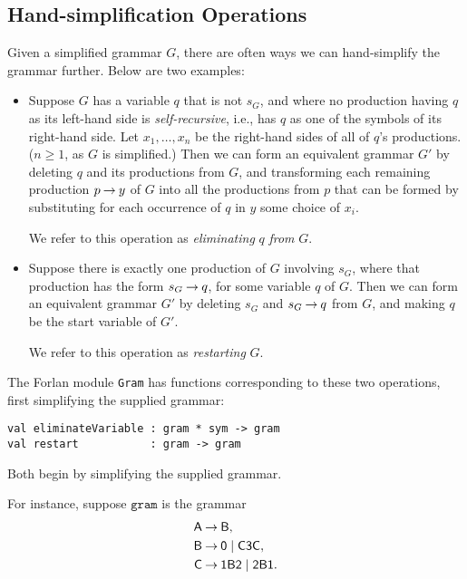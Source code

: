 \subsection{Hand-simplification Operations}

%
%
Given a simplified grammar $G$, there are often ways we can hand-simplify
the grammar further. Below are two examples:
\begin{itemize}
\item Suppose $G$ has a variable $q$ that is not $s_G$, and where no
  production having $q$ as its left-hand side is
  \emph{self-recursive}, i.e., has $q$ as one of the symbols of its
  right-hand side. Let $x_1,\ldots,x_n$ be the right-hand sides of all
  of $q$'s productions. ($n\geq 1$, as $G$ is simplified.)  Then we
  can form an equivalent grammar $G'$ by deleting $q$ and its
  productions from $G$, and transforming each remaining production
  $p\mathbin{\to} y$ of $G$ into all the productions from $p$ that can be
  formed by substituting for each occurrence of $q$ in $y$ some choice
  of $x_i$.

  We refer to this operation as \emph{eliminating} $q$ \emph{from}
%
  $G$.

\item Suppose there is exactly one production of $G$ involving $s_G$,
  where that production has the form $s_G\mathbin{\to} q$, for some variable
  $q$ of $G$. Then we can form an equivalent grammar $G'$ by deleting
  $s_G$ and $s_G\mathbin{\to} q$ from $G$, and making $q$ be the start variable
  of $G'$.

  We refer to this operation as \emph{restarting} $G$.
%
\end{itemize}

The Forlan module \texttt{Gram} has functions corresponding to these
two operations, first simplifying the supplied grammar:
\begin{verbatim}
val eliminateVariable : gram * sym -> gram
val restart           : gram -> gram
\end{verbatim}
%
%
Both begin by simplifying the supplied grammar.

For instance, suppose $\texttt{gram}$ is the grammar
\begin{align*}
\mathsf{A} &\mathbin{\to} \mathsf{B}, \\
\mathsf{B} &\mathbin{\to} \mathsf{0} \mid \mathsf{C}\mathsf{3}\mathsf{C} , \\
\mathsf{C} &\mathbin{\to} \mathsf{1}\mathsf{B}\mathsf{2} \mid \mathsf{2}\mathsf{B}\mathsf{1} .
\end{align*}

